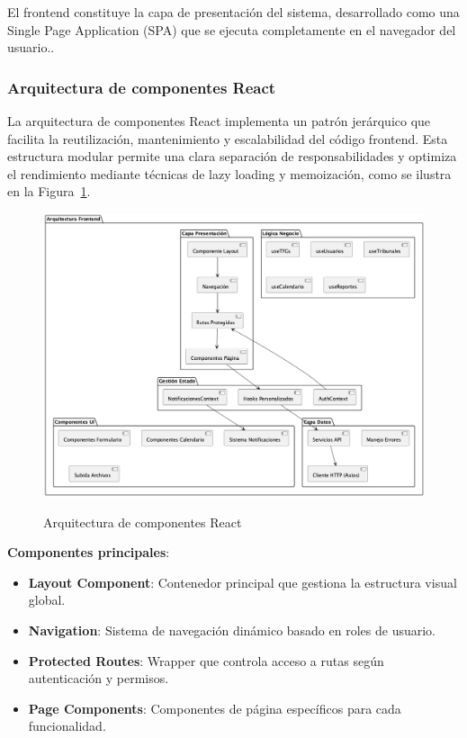 \documentclass[12pt,a4paper,oneside]{report}
\providecommand{\tightlist}{%
  \setlength{\itemsep}{0pt}\setlength{\parskip}{0pt}}
\providecommand{\pandocbounded}[1]{#1}
\begin{document}
El frontend constituye la capa de presentación del sistema, desarrollado
como una Single Page Application (SPA) que se ejecuta completamente en
el navegador del usuario..

\subsubsection{Arquitectura de componentes
React}\label{arquitectura-de-componentes-react}

La arquitectura de componentes React implementa un patrón jerárquico que facilita la reutilización, mantenimiento y escalabilidad del código frontend. Esta estructura modular permite una clara separación de responsabilidades y optimiza el rendimiento mediante técnicas de lazy loading y memoización, como se ilustra en la Figura~\ref{fig:arquitectura-componentes-react}.

\begin{figure}[H]
\centering
\pandocbounded{\includegraphics[keepaspectratio,alt={Arquitectura de componentes React}]{processed/images/05_diseno_plantuml_0.png}}
\caption{Arquitectura de componentes React}
\label{fig:arquitectura-componentes-react}
\end{figure}

\textbf{Componentes principales}:

\begin{itemize}
\tightlist
\item
  \textbf{Layout Component}: Contenedor principal que gestiona la
  estructura visual global.
\item
  \textbf{Navigation}: Sistema de navegación dinámico basado en roles de
  usuario.
\item
  \textbf{Protected Routes}: Wrapper que controla acceso a rutas según
  autenticación y permisos.
\item
  \textbf{Page Components}: Componentes de página específicos para cada
  funcionalidad.
\end{itemize}
\end{document}
